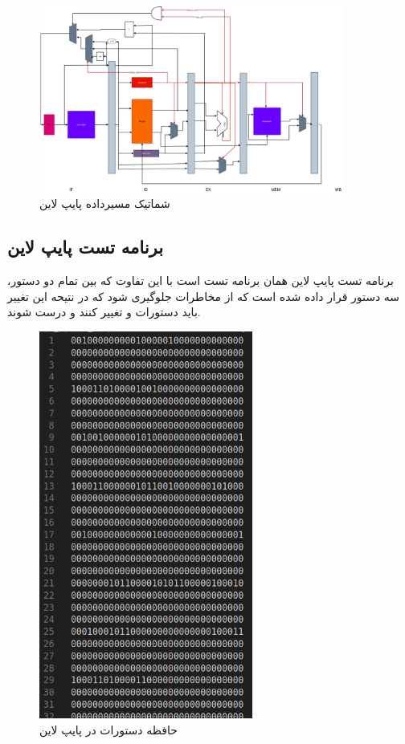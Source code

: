 \documentclass[11pt, a4paper]{article}
\begin{document}
	\begin{figure}[H]
		\begin{center}
			\includegraphics[width=10cm]{Photos/Pipeline_Figure.jpg}
		\end{center}
		\caption{شماتیک مسیرداده پایپ لاین}
		\label{Pipeline_schamitic}
	\end{figure}
 

	\subsection{برنامه تست پایپ لاین}
	برنامه تست پایپ لاین همان برنامه تست 
	است با این تفاوت که بین تمام دو دستور، سه دستور 
	قرار داده شده است که از مخاطرات جلوگیری شود که در نتیحه این تغییر باید دستورات 
	و
	تغییر کنند و درست شوند. 
	\begin{figure}[H]
		\begin{center}
			\includegraphics[width=7cm]{Photos/4.png}
		\end{center}
		\caption{حافظه دستورات در پایپ لاین}
		\label{Pipeline_inst_test}
	\end{figure}
	
\end{document}
